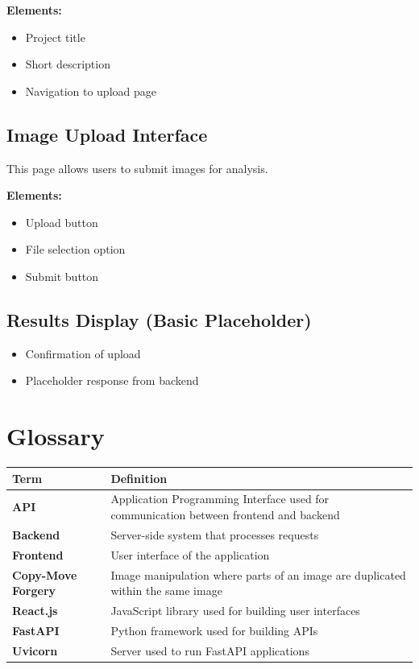 \documentclass[12pt]{article}
\begin{document}
\textbf{Elements:}
\begin{itemize}[noitemsep]
    \item Project title
    \item Short description
    \item Navigation to upload page
\end{itemize}

\subsection{Image Upload Interface}

This page allows users to submit images for analysis.

\textbf{Elements:}
\begin{itemize}[noitemsep]
    \item Upload button
    \item File selection option
    \item Submit button
\end{itemize}

\subsection{Results Display (Basic Placeholder)}

\begin{itemize}[noitemsep]
    \item Confirmation of upload
    \item Placeholder response from backend
\end{itemize}

\section{Glossary}

\begin{longtable}{>{\bfseries}p{} p{}}
\toprule
Term & Definition \\
\midrule
\endhead
API & Application Programming Interface used for communication between frontend and backend \\[0.5em]
Backend & Server-side system that processes requests \\[0.5em]
Frontend & User interface of the application \\[0.5em]
Copy-Move Forgery & Image manipulation where parts of an image are duplicated within the same image \\[0.5em]
React.js & JavaScript library used for building user interfaces \\[0.5em]
FastAPI & Python framework used for building APIs \\[0.5em]
Uvicorn & Server used to run FastAPI applications \\
\bottomrule
\end{longtable}
\end{document}
